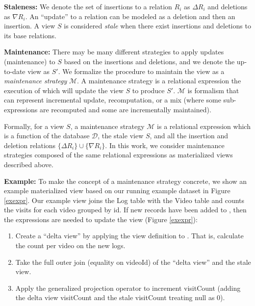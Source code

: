 \noindent \textbf{Staleness: } We denote the set of insertions to a relation $R_i$ as $\Delta R_i$ and deletions as $\nabla R_i$.
An ``update'' to a relation can be modeled as a deletion and then an insertion.
A view $S$ is considered \emph{stale} when there exist insertions and deletions to its base relations.

\noindent \textbf{Maintenance: } There may be many different strategies to apply updates (maintenance) to $S$ based on the insertions and deletions, and we denote the up-to-date view as $S'$.
We formalize the procedure to maintain the view as a \emph{maintenance strategy} $\mathcal{M}$.
A maintenance strategy is a relational expression the execution of which will update the view $S$ to produce $S'$.
$\mathcal{M}$ is formalism that can represent incremental update, recomputation, or a mix (where some sub-expressions are recomputed and some are incrementally maintained). 

Formally, for a view $S$, a maintenance strategy $\mathcal{M}$ is a relational expression which is a function of the database $\mathcal{D}$, the stale view $S$, and all the insertion and deletion relations $\{\Delta R_i\} \cup \{\nabla R_i\}$.
In this work, we consider maintenance strategies composed of the same relational expressions as materialized views described above.

\noindent \textbf{Example: }
To make the concept of a maintenance strategy concrete, we show an example materialized view based on our running example dataset in Figure \ref{exexpr}.
Our example view joins the Log table with the Video table and counts the visits for each video grouped by id.
If new records have been added to , then the expressions are needed to update the view (Figure \ref{exexpr}):
\begin{enumerate}[noitemsep]
\item Create a ``delta view'' by applying the view definition to . That is, calculate the count 
per video on the new logs.
\item Take the full outer join (equality on \textsf{videoId}) of the ``delta view'' and the stale view.
\item Apply the generalized projection operator to increment \textsf{visitCount} (adding the delta view \textsf{visitCount} and the stale \textsf{visitCount} treating null as 0).
\end{enumerate}

